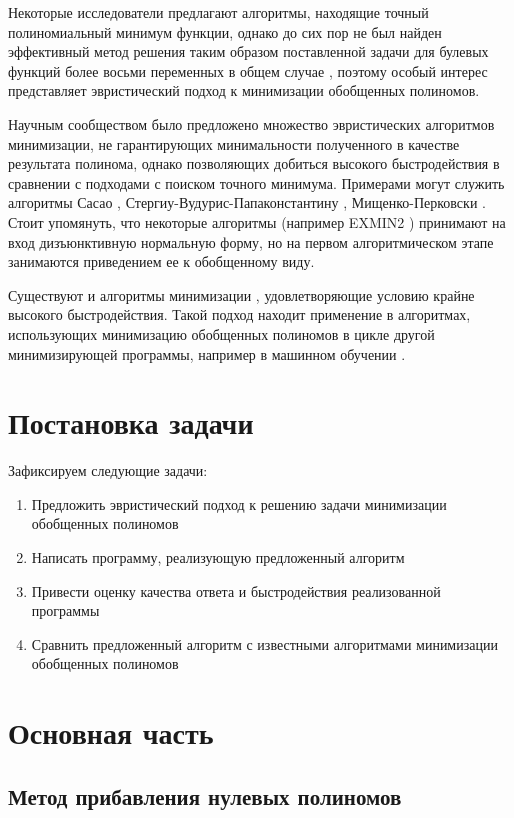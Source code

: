 \documentclass[a4paper,12pt,titlepage]{article}
\begin{document}
Некоторые исследователи предлагают алгоритмы, находящие точный полиномиальный минимум \cite{min-tau,exact6,exact} функции, однако до сих пор не был найден эффективный метод решения таким образом поставленной задачи для булевых функций более восьми переменных в общем случае \cite{exact8}, поэтому особый интерес представляет эвристический подход к минимизации обобщенных полиномов.

Научным сообществом было предложено множество эвристических алгоритмов минимизации, не гарантирующих минимальности полученного в качестве результата полинома, однако позволяющих добиться высокого быстродействия в сравнении с подходами с поиском точного минимума. Примерами могут служить алгоритмы Сасао \cite{exmin2}, Стергиу-Вудурис-Папаконстантину \cite{mvesopmin}, Мищенко-Перковски \cite{exorcism4}. Стоит упомянуть, что некоторые алгоритмы (например \textsc{EXMIN2} \cite{exmin2}) принимают на вход дизъюнктивную нормальную форму, но на первом алгоритмическом этапе занимаются приведением ее к обобщенному виду.

Существуют и алгоритмы минимизации \cite{exorcism-mv3}, удовлетворяющие условию крайне высокого быстродействия. Такой подход находит применение в алгоритмах, использующих минимизацию обобщенных полиномов в цикле другой минимизирующей программы, например в машинном обучении \cite{machine-learning}.

\section{Постановка задачи}

Зафиксируем следующие задачи:
\begin{enumerate}
    \item Предложить эвристический подход к решению задачи минимизации обобщенных полиномов
    \item Написать программу, реализующую предложенный алгоритм
    \item Привести оценку качества ответа и быстродействия реализованной программы
    \item Сравнить предложенный алгоритм с известными алгоритмами минимизации обобщенных полиномов
\end{enumerate}

\section{Основная часть}

\subsection{Метод прибавления нулевых полиномов}
\end{document}
